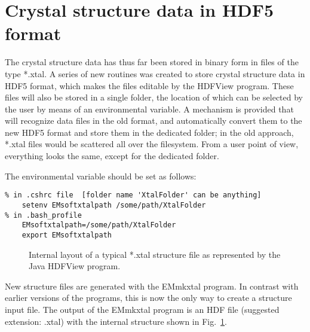 \documentclass[DIV=calc, paper=letter, fontsize=11pt]{scrartcl}	 %
\begin{document}
\section{Crystal structure data in HDF5 format}
The crystal structure data has thus far been stored in binary form in files of the type \textsf{*.xtal}. 
A series of new routines was created to store crystal structure data in HDF5 format, which makes the 
files editable by the HDFView program.  These files will also be stored in a single folder, the location 
of which can be selected by the user by means of an environmental variable.  A mechanism is provided that 
will recognize data files in the old format, and automatically convert them to the new HDF5 format and 
store them in the dedicated folder; in the old approach, \textsf{*.xtal} files would be scattered all 
over the filesystem.  From a user point of view, everything looks the same, except for the dedicated folder.

The environmental variable should be set as follows:
\begin{verbatim}
% in .cshrc file  [folder name 'XtalFolder' can be anything]
    setenv EMsoftxtalpath /some/path/XtalFolder
% in .bash_profile
    EMsoftxtalpath=/some/path/XtalFolder
    export EMsoftxtalpath
\end{verbatim}

\begin{figure}[h]
\leavevmode\centering
\epsfysize=4in
\caption{\label{fig:XtalFile}Internal layout of a typical \textsf{*.xtal} structure file as represented by the Java \textsf{HDFView} program.}
\end{figure}

New structure files are generated with the \textsf{EMmkxtal} program.  In contrast with earlier versions
of the programs, this is now the only way to create a structure input file.  The output of the \textsf{EMmkxtal}
program is an HDF file (suggested extension: \textsf{.xtal}) with the internal structure shown in Fig.~\ref{fig:XtalFile}.
\end{document}
